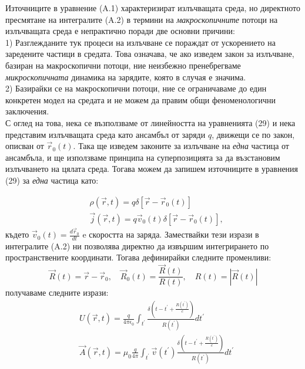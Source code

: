 \begin{appendices}
	Източниците в уравнение (A.1) характеризират излъчващата среда, но директното пресмятане на интегралите (A.2) в термини на \emph{макроскопичните} потоци на излъчващата среда е непрактично поради две основни причини:\\
	
	1) Разглежданите тук процеси на излъчване се пораждат от ускорението на заредените частици в средата. Това означава, че ако изведем закон за излъчване, базиран на макроскопични потоци, ние неизбежно пренебрегваме \emph{микроскопичната} динамика на зарядите, която в случая е значима.\\
	
	2) Базирайки се на макроскопични потоци, ние се ограничаваме до един конкретен модел на средата и не можем да правим общи феноменологични заключения.\\
	
	С оглед на това, нека се възползваме от линейността на уравненията (29) и нека представим излъчващата среда като ансамбъл от заряди $q$, движещи се по закон, описван от $\vec{r}_0(t)$. Така ще изведем законите за излъчване на \emph{една} частица от ансамбъла, и ще използваме принципа на суперпозицията за да възстановим излъчването на цялата среда. Тогава можем да запишем източниците в уравнения (29) за \emph{една} частица като:
	
	\begin{equation}
		\begin{split}
		&\rho(\vec{r},t) = q \delta\left[\vec{r} - \vec{r}_0(t)\right]\\
		&\vec{j}(\vec{r}, t) = q \vec{v}_0(t)\delta\left[\vec{r} - \vec{r}_0(t)\right],
		\end{split}
	\end{equation}
	където $\vec{v}_0(t) = \frac{d\vec{r}_0}{dt}$ e скоростта на заряда. Замествайки тези изрази в интегралите (A.2) ни позволява директно да извършим интегрирането по пространствените координати. Тогава дефинирайки следните променливи:
	\begin{equation}
		\vec{R}(t) = \vec{r} - \vec{r}_0, \quad \vec{R}_0(t) = \frac{\vec{R}(t)}{R(t)},\quad R(t) = |\vec{R}(t)|
	\end{equation}
	получаваме следните изрази:
	\begin{equation}
		\begin{split}
		&U(\vec{r},t) = \frac{q}{4\pi\epsilon_0}\int_{t^\prime}\frac{\delta\left(t - t^\prime + \frac{R(t^\prime)}{c}\right)}{R(t^\prime)}dt^\prime\\
		&\vec{A}(\vec{r},t) = \mu_0\frac{q}{4\pi}\int_{t^\prime}\vec{v}(t^\prime)\frac{\delta\left(t - t^\prime + \frac{R(t^\prime)}{c}\right)}{R(t^\prime)}dt^\prime\\
		\end{split}
	\end{equation}
	

\end{appendices}
